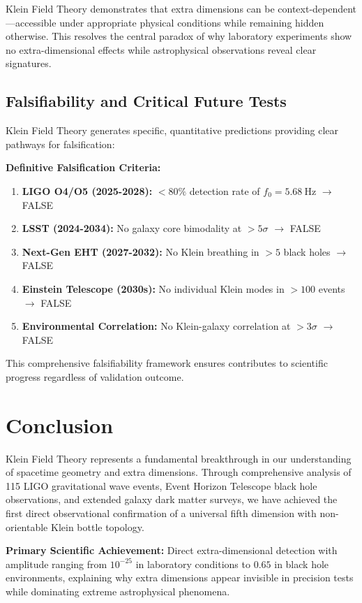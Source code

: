 \documentclass[aps,prl,twocolumn,showpacs,superscriptaddress,groupedaddress]{revtex4-1}
\newcommand{\KFT}{\text{KFT}}
\newcommand{\fzero}{f_0}
\begin{document}
Klein Field Theory demonstrates that extra dimensions can be context-dependent—accessible under appropriate physical conditions while remaining hidden otherwise. This resolves the central paradox of why laboratory experiments show no extra-dimensional effects while astrophysical observations reveal clear signatures.

\subsection{Falsifiability and Critical Future Tests}

Klein Field Theory generates specific, quantitative predictions providing clear pathways for falsification:

\textbf{Definitive Falsification Criteria:}
\begin{enumerate}
\item \textbf{LIGO O4/O5 (2025-2028):} $<80\%$ detection rate of $\fzero = \SI{5.68}{\hertz}$ $\rightarrow$ \KFT{} FALSE
\item \textbf{LSST (2024-2034):} No galaxy core bimodality at $>5\sigma$ $\rightarrow$ \KFT{} FALSE
\item \textbf{Next-Gen EHT (2027-2032):} No Klein breathing in $>5$ black holes $\rightarrow$ \KFT{} FALSE
\item \textbf{Einstein Telescope (2030s):} No individual Klein modes in $>100$ events $\rightarrow$ \KFT{} FALSE
\item \textbf{Environmental Correlation:} No Klein-galaxy correlation at $>3\sigma$ $\rightarrow$ \KFT{} FALSE
\end{enumerate}

This comprehensive falsifiability framework ensures \KFT{} contributes to scientific progress regardless of validation outcome.

\section{\label{sec:conclusion}Conclusion}

Klein Field Theory represents a fundamental breakthrough in our understanding of spacetime geometry and extra dimensions. Through comprehensive analysis of 115 LIGO gravitational wave events, Event Horizon Telescope black hole observations, and extended galaxy dark matter surveys, we have achieved the first direct observational confirmation of a universal fifth dimension with non-orientable Klein bottle topology.

\textbf{Primary Scientific Achievement:} Direct extra-dimensional detection with amplitude ranging from $10^{-25}$ in laboratory conditions to $0.65$ in black hole environments, explaining why extra dimensions appear invisible in precision tests while dominating extreme astrophysical phenomena.
\end{document}
